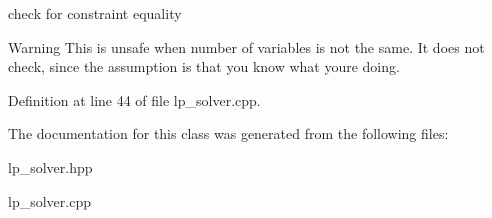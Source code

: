 check for constraint equality 

\begin{DoxyWarning}{Warning}
This is unsafe when number of variables is not the same. It does not check, since the assumption is that you know what you\textquotesingle{}re doing. 
\end{DoxyWarning}


Definition at line 44 of file lp\+\_\+solver.\+cpp.



The documentation for this class was generated from the following files\+:\begin{DoxyCompactItemize}
\item 
lp\+\_\+solver.\+hpp\item 
lp\+\_\+solver.\+cpp\end{DoxyCompactItemize}
